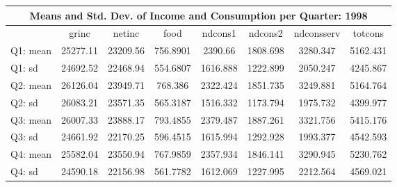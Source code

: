 \begin{tabular}{l*{7}{c}}
\hline\hline
\multicolumn{8}{c}{Means and Std. Dev. of Income and Consumption per Quarter: 1998}  \\
\hline    
            &       grinc&      netinc&        food&     ndcons1&     ndcons2&  ndconsserv&     totcons\\
\hline
Q1: mean     &    25277.11&    23209.56&    756.8901&     2390.66&    1808.698&    3280.347&    5162.431\\
Q1: sd   &    24692.52&    22468.94&    554.6807&    1616.888&    1222.899&    2050.247&    4245.867\\
Q2: mean   &    26126.04&    23949.71&     768.386&    2322.424&    1851.735&    3249.881&    5164.764\\
Q2: sd   &    26083.21&    23571.35&    565.3187&    1516.332&    1173.794&    1975.732&    4399.977\\
Q3: mean    &    26007.33&    23888.17&    793.4855&    2379.487&    1887.261&    3321.756&    5415.176\\
Q3: sd    &    24661.92&    22170.25&    596.4515&    1615.994&    1292.928&    1993.377&    4542.593\\
Q4: mean    &    25582.04&    23550.94&    767.9859&    2357.934&    1846.141&    3290.945&    5230.762\\
Q4: sd    &    24590.18&    22156.98&    561.7782&    1612.069&    1227.995&    2212.564&    4569.021\\
\hline\hline
\end{tabular}
